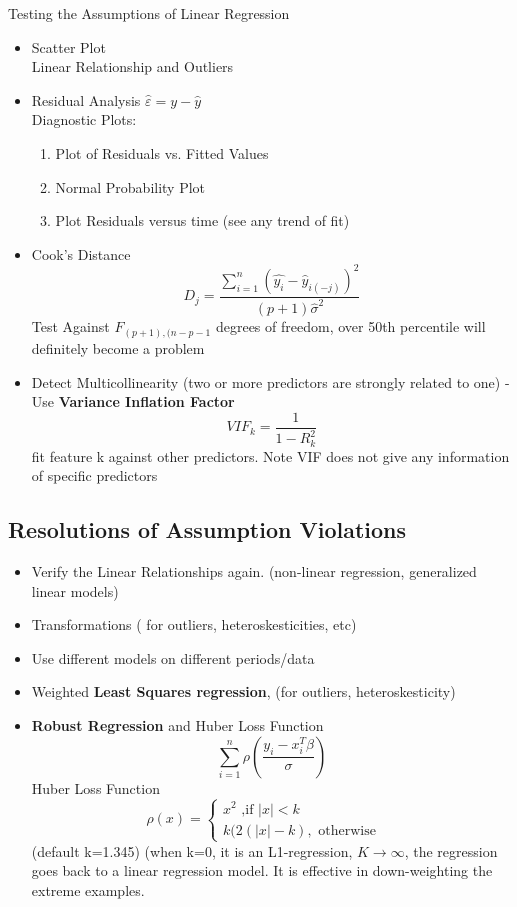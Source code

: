 \documentclass[11pt, openany]{book}              %
\begin{document}
Testing the Assumptions of Linear Regression 

\begin{itemize}
    \item Scatter Plot \\ Linear Relationship and Outliers
    \item Residual Analysis $\hat{\varepsilon} = y - \hat{y}$ \\ Diagnostic Plots:
    \begin{enumerate}
        \item Plot of Residuals vs. Fitted Values
        \item Normal Probability Plot 
        \item Plot Residuals versus time (see any trend of fit)
	\end{enumerate}
	\item Cook's Distance $$D_j = \frac{\sum_{i=1}^n (\hat{y_i} - \hat{y}_{i(-j)})^2}{(p+1)\hat{\sigma}^2}$$ 
	Test Against $F_{(p+1),(n-p-1}$ degrees of freedom, over 50th percentile will definitely become a problem
	\item Detect Multicollinearity (two or more predictors are strongly related to one) - Use \textbf{Variance Inflation Factor}
		$$VIF_k = \frac{1}{1-R_k^2}$$
		fit feature k against other predictors. Note VIF does not give any information of specific predictors 
\end{itemize}

\subsection{Resolutions of Assumption Violations}

\begin{itemize}
    \item Verify the Linear Relationships again. (non-linear regression, generalized linear models)
    \item Transformations ( for outliers, heteroskesticities, etc)
    \item Use different models on different periods/data
    \item Weighted \textbf{Least Squares regression},  (for outliers, heteroskesticity) 
    \item \textbf{Robust Regression} and Huber Loss Function $$\sum_{i=1}^n \rho(\frac{y_i-x_i^T\beta}{\sigma})$$
		Huber Loss Function
		 $$\rho(x) = \left\{
             \begin{array}{lr}
             x^2 \text{  ,if } |x|<k &  \\
             k(2(|x|-k), \text{ otherwise } &  
             \end{array}
      \right.$$
       (default k=1.345) (when k=0, it is an L1-regression, $K\to \infty$, the regression goes back to a linear regression model. It is effective in down-weighting the extreme examples.
\end{itemize}
\end{document}
